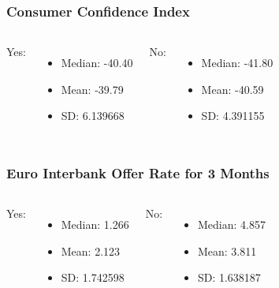 \documentclass{beamer}
\begin{document}
\begin{frame}
	\frametitle{Consumer Confidence Index}
	\begin{columns}[c] %
		
    Yes:
		\begin{itemize}
			\item Median: -40.40
			\item Mean: -39.79
      \item SD: 6.139668
		\end{itemize}
		
    No:
		\begin{itemize}
			\item Median: -41.80
			\item Mean: -40.59
      \item SD: 4.391155
		\end{itemize}
		
	\end{columns}
\end{frame}

\begin{frame}
	\frametitle{Euro Interbank Offer Rate for 3 Months}
	\begin{columns}[c] %
		
    Yes:
		\begin{itemize}
			\item Median: 1.266
			\item Mean: 2.123
      \item SD: 1.742598
		\end{itemize}
		
    No:
		\begin{itemize}
			\item Median: 4.857
			\item Mean: 3.811
      \item SD: 1.638187
		\end{itemize}
		
	\end{columns}
\end{frame}
\end{document}
